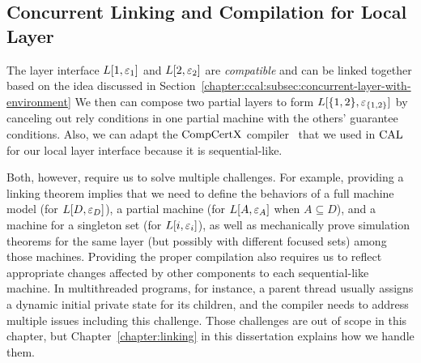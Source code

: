 \subsection{Concurrent Linking and Compilation for Local Layer}
\label{chapter:ccal:subsec:concurrent-linking-and compilation-for-local-layer}

The layer interface $L[1, {\varepsilon}_1]$ and $L[2, {\varepsilon}_2]$ are  {\em compatible} and can be linked together based on
the idea discussed in Section~\ref{chapter:ccal:subsec:concurrent-layer-with-environment}
We then can compose two partial layers to form 
$L[\{1, 2\}, {\varepsilon}_{\{1, 2\}}]$ by canceling out rely conditions in one partial machine with the others' guarantee conditions.
Also, we can adapt the $\mathrm{CompCertX}$ compiler~\cite{deepspec} that we used in $\mathrm{CAL}$
for our local layer interface because it is sequential-like.

Both, however, require us to solve multiple challenges. 
For example, providing a linking theorem  
implies that we need to define the behaviors of a full machine model (for $L[D, {\varepsilon}_{D}]$), a partial machine (for $L[A, {\varepsilon}_{A}]$ when $A \subseteq D$), and 
a machine for a singleton set (for $L[i, {\varepsilon}_{i}]$), as well as mechanically prove simulation theorems for the same layer (but possibly with different focused sets) among those machines. 
Providing the proper compilation also requires 
us to reflect appropriate changes affected by other components to each sequential-like machine.
In multithreaded programs, for instance, a parent thread usually assigns a dynamic initial private state for its children,
and the compiler needs to address multiple issues including this challenge. 
Those challenges are out of scope in this chapter, but Chapter~\ref{chapter:linking} in this dissertation explains how we handle them.
